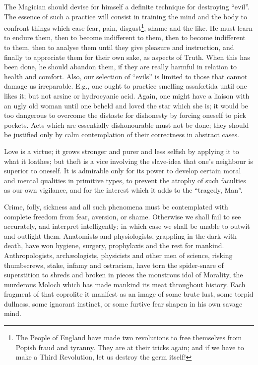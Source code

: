 The Magician should devise for himself a definite technique for destroying \enquote{evil}. The essence of such a practice will consist in training the mind and the body to confront things which case fear, pain, disgust\footnote{The People of England have made two revolutions to free themselves from Popish fraud and tyranny. They are at their tricks again; and if we have to make a Third Revolution, let us destroy the germ itself!}, shame and the like. He must learn to endure them, then to become indifferent to them, then to become indifferent to them, then to analyse them until they give pleasure and instruction, and finally to appreciate them for their own sake, as aspects of Truth. When this has been done, he should abandon them, if they are really harmful in relation to health and comfort. Also, our selection of \enquote{evils} is limited to those that cannot damage us irreparable. E.g., one ought to practice smelling assaf\oe{}tida until one likes it; but not arsine or hydrocyanic acid. Again, one might have a liaison with an ugly old woman until one beheld and loved the star which she is; it would be too dangerous to overcome the distaste for dishonesty by forcing oneself to pick pockets. Acts which are essentially dishonourable must not be done; they should be justified only by calm contemplation of their correctness in abstract cases.

Love is a virtue; it grows stronger and purer and less selfish by applying it to what it loathes; but theft is a vice involving the slave-idea that one's neighbour is superior to oneself. It is admirable only for its power to develop certain moral and mental qualities in primitive types, to prevent the atrophy of such faculties as our own vigilance, and for the interest which it adds to the \enquote{tragedy, Man}.

Crime, folly, sickness and all such phenomena must be contemplated with complete freedom from fear, aversion, or shame. Otherwise we shall fail to see accurately, and interpret intelligently; in which case we shall be unable to outwit and outfight them. Anatomists and physiologists, grappling in the dark with death, have won hygiene, surgery, prophylaxis and the rest for mankind. Anthropologists, arch\ae{}ologists, physicists and other men of science, risking thumbscrews, stake, infamy and ostracism, have torn the spider-snare of superstition to shreds and broken in pieces the monstrous idol of Morality, the murderous Moloch which has made mankind its meat throughout history. Each fragment of that coprolite it manifest as an image of some brute lust, some torpid dullness, some ignorant instinct, or some furtive fear shapen in his own savage mind.


